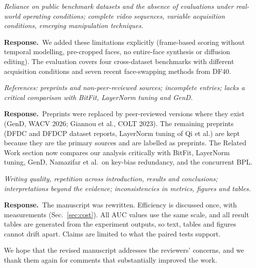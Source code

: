 \documentclass[11pt]{article}
\newenvironment{comment}{\par\medskip\noindent\begin{minipage}{\linewidth}\color{black!70}\itshape}{\end{minipage}\par\smallskip}
\newcommand{\resp}{\noindent\textbf{Response.}~}
\begin{document}
\begin{comment}
Reliance on public benchmark datasets and the absence of evaluations under real-world operating conditions; complete video sequences, variable acquisition conditions, emerging manipulation techniques.
\end{comment}
\resp We added these limitations explicitly (frame-based scoring without temporal modelling, pre-cropped faces, no entire-face synthesis or diffusion editing). The evaluation covers four cross-dataset benchmarks with different acquisition conditions and seven recent face-swapping methods from DF40.

\begin{comment}
References: preprints and non-peer-reviewed sources; incomplete entries; lacks a critical comparison with BitFit, LayerNorm tuning and GenD.
\end{comment}
\resp Preprints were replaced by peer-reviewed versions where they exist (GenD, WACV 2026; Giannou et al., COLT 2023). The remaining preprints (DFDC and DFDCP dataset reports, LayerNorm tuning of Qi et al.) are kept because they are the primary sources and are labelled as preprints. The Related Work section now compares our analysis critically with BitFit, LayerNorm tuning, GenD, Namazifar et al.\ on key-bias redundancy, and the concurrent BPL.

\begin{comment}
Writing quality, repetition across introduction, results and conclusions; interpretations beyond the evidence; inconsistencies in metrics, figures and tables.
\end{comment}
\resp The manuscript was rewritten. Efficiency is discussed once, with measurements (Sec.~\ref{sec:cost}). All AUC values use the same scale, and all result tables are generated from the experiment outputs, so text, tables and figures cannot drift apart. Claims are limited to what the paired tests support.

\bigskip
\noindent We hope that the revised manuscript addresses the reviewers' concerns, and we thank them again for comments that substantially improved the work.
\end{document}
